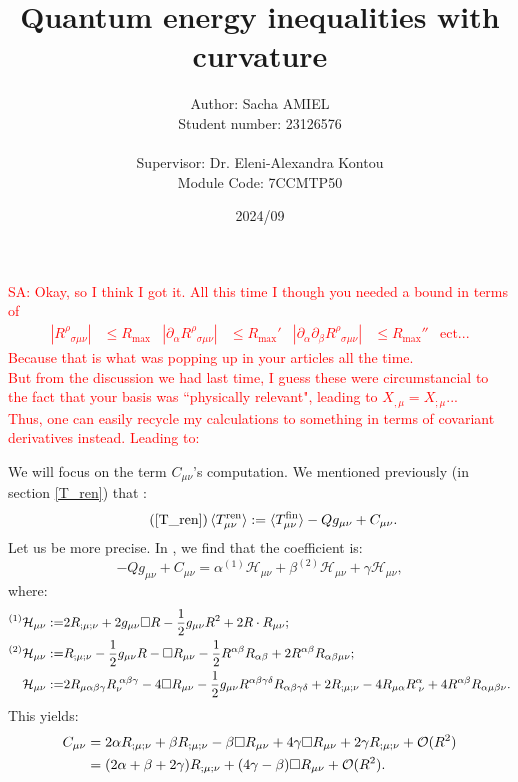 \documentclass[a4paper,11pt]{article}
\title{Quantum energy inequalities with curvature}
\author{Author: Sacha AMIEL \\
Student number: 23126576\\
\\ Supervisor: Dr. Eleni-Alexandra Kontou \\ Module Code: 7CCMTP50}
\date{2024/09}
\numberwithin{equation}{section}
\theoremstyle{definition}
\newcommand{\SA}[1]{\textcolor{red}{SA: #1}}
\begin{document}
\SA{Okay, so I think I got it. All this time I though you needed a bound in terms of
\begin{align}
    |R^\rho_{\;\;\sigma\mu\nu}| &\leq R_\mathrm{max}&
    |\partial_\alpha R^\rho_{\;\;\sigma\mu\nu}| &\leq
    R_\mathrm{max}'&
    |\partial_\alpha\partial_\beta
    R^\rho_{\;\;\sigma\mu\nu}| & \leq R_\mathrm{max}''&
    \mathrm{ect}...
\end{align}
Because that is what was popping up in your articles all the time.
\\
But from the discussion we had last time, I guess these were circumstancial to the fact that your basis was ``physically relevant", leading to $X_{,\mu}=X_{;\mu}$...
\\
Thus, one can easily recycle my calculations to something in terms of covariant derivatives instead. Leading to:
}

\noindent
We will focus on the term $C_{\mu\nu}$'s computation. We mentioned previously (in section \ref{T_ren}) that :
\begin{equation}\tag{\ref{T_ren}}
    \braket{T^\mathrm{ren}_{\mu\nu}}:=\braket{T^\mathrm{fin}_{\mu\nu}}-Qg_{\mu\nu} + C_{\mu\nu}.
    \end{equation}
Let us be more precise. In \cite{QFTCurv}, we find that the coefficient is:
\begin{equation}
    -Qg_{\mu\nu}+C_{\mu\nu}=\alpha^{(1)}\mathcal{H}_{\mu\nu}+\beta^{(2)}\mathcal{H}_{\mu\nu}+\gamma\mathcal{H}_{\mu\nu},
\end{equation}
where:
\begin{align}
    ^{(1)}\mathcal{H}_{\mu\nu}:=& 2R_{;\mu;\nu}+ 2g_{\mu\nu}\square R - \frac{1}{2}g_{\mu\nu} R^2 + 2 R\cdot R_{\mu\nu}\notag;\\
    ^{(2)}\mathcal{H}_{\mu\nu}:=& R_{;\mu;\nu} - \frac{1}{2}g_{\mu\nu}R-\square R_{\mu\nu} -\frac{1}{2} R^{\alpha\beta}R_{\alpha\beta}+2R^{\alpha\beta}R_{\alpha\beta\mu\nu};\\
    \mathcal{H}_{\mu\nu}:=& 2R_{\mu\alpha\beta\gamma}R_\nu^{\;\alpha\beta\gamma}-4\square R_{\mu\nu} -\frac{1}{2}g_{\mu\nu}R^{\alpha\beta\gamma\delta}R_{\alpha\beta\gamma\delta} + 2 R_{;\mu;\nu} - 4 R_{\mu\alpha}R^{\alpha}_{\;\nu}+4R^{\alpha\beta}R_{\alpha\mu\beta\nu}\notag.
\end{align}
This yields:
\begin{align}
    C_{\mu\nu} &= 2\alpha R_{;\mu;\nu} + \beta R_{;\mu;\nu} - \beta\square R_{\mu\nu} +4\gamma \square R_{\mu\nu} + 2\gamma R_{;\mu;\nu} + \mathcal{O}(R^2)\notag\\
    &= (2\alpha + \beta + 2\gamma) R_{;\mu;\nu} +(4\gamma- \beta)\square R_{\mu\nu} + \mathcal{O}(R^2) \label{C=A+B}.
\end{align}
\end{document}
